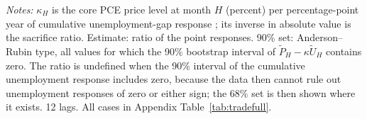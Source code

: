 \begin{table}[tp]\centering\footnotesize\setlength{\tabcolsep}{3pt}
\caption{Implied Trade-Off: The Phillips Multiplier}\label{tab:tradeoff}
\begin{flushleft}\footnotesize\textit{Notes:} $\kappa_H$ is the core PCE price level at month $H$ (percent) per percentage-point year of cumulative unemployment-gap response \citep{barnichon2021}; its inverse in absolute value is the sacrifice ratio. Estimate: ratio of the point responses. 90\% set: Anderson--Rubin type, all values for which the 90\% bootstrap interval of $\tilde P_H-\kappa\tilde U_H$ contains zero. The ratio is undefined when the 90\% interval of the cumulative unemployment response includes zero, because the data then cannot rule out unemployment responses of zero or either sign; the 68\% set is then shown where it exists. 12 lags. All cases in Appendix Table~\ref{tab:tradefull}.\end{flushleft}
\end{table}
